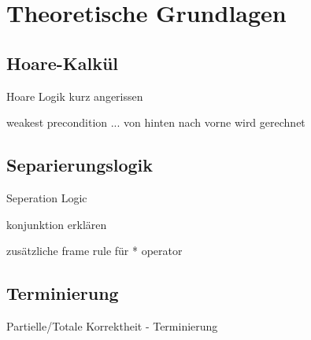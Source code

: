 ﻿
\chapter{Theoretische Grundlagen}

\section{Hoare-Kalkül}

Hoare Logik kurz angerissen

weakest precondition ... von hinten nach vorne wird gerechnet


\section{Separierungslogik}
\label{sec:theorie:seperation-logic}

Seperation Logic

konjunktion erklären

zusätzliche frame rule für * operator

\section{Terminierung}

Partielle/Totale Korrektheit - Terminierung
